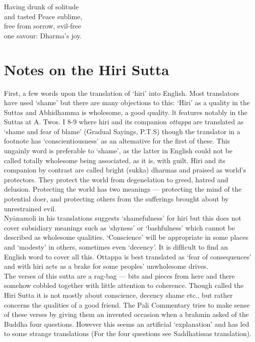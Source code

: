 \begin{MyDescription}{}
Having drunk of solitude\\
and tasted Peace sublime,\\
free from sorrow, evil-free\\
one savour: Dharma's joy.
\end{MyDescription}

\begin{MyDescription}[(Sn. 253-257)]{}
\end{MyDescription}
\newpage
\section{Notes on the Hiri Sutta}
First, a few words upon the translation of `hiri' into English. Most translators have used `shame' but there are many objections to this: `Hiri' as a quality in the Suttas and Abhidhamma is wholesome, a good quality. lt features notably in the Suttas at A. Twos. I 8-9 where hiri and its companion \textit{ottappa} are translated as `shame and fear of blame' (Gradual Sayings, P.T.S) though the translator in a footnote has `conscientiousness' as an altemative for the ﬁrst of these. This ungainly word is preferable to `shame', as the latter in English could not be called totally wholesome being associated, as it is, with guilt. Hiri and its companion by contrast are called bright (sukka) dharmas and praised as world's protectors. They protect the world from degenelation to greed, hatred and delusion. Protecting the world has two meanings — protecting the mind of the potential doer, and protecting others from the sufferings brought about by unrestrained evil.\\

Ny\=anamoli in his translations suggests `shamefulness' for hiri but this does not cover subsidiary meanings such as `shyness' or `bashfulness' which cannot be described as wholesome qualities. `Conscience' will be appropriate in some places and `modesty' in others, sometimes even `decency'. It is difﬁcult to ﬁnd an English word to cover all this. Ottappa is best translated as `fear of consequences' and with hiri acts as a brake for some peoples' unwholesome drives.\\

The verses of this sutta are a rag-bag — bits and pieces from here and there somehow cobbled together with little attention to coherence. Though called the Hiri Sutta it is not mostly about conscience, decency shame etc., but rather concerns the qualities of a good friend. The Pali Commentary tries to make sense of these verses by giving them an invented occasion when a brahmin asked of the Buddha four questions. However this seems an artificial `explanation' and has led to some strange translations (For the four questions see Saddhatissas translation).\\


